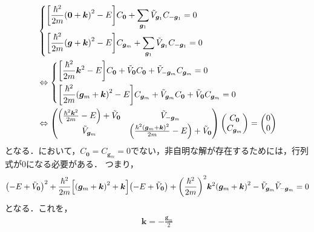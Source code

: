 \documentclass{report}
\begin{document}
      \begin{align}
        & \begin{dcases}
          \qty[\frac{\hbar^2}{2m}\qty(\bm{0} + \bm{k})^2 - E]C_{\bm{0}} + \sum_{\bm{g}_1}\tilde{V}_{\bm{g}_1}C_{-\bm{g}_1} = 0 \\
          \qty[\frac{\hbar^2}{2m}\qty(\bm{g} + \bm{k})^2 - E]C_{\bm{g}_m} + \sum_{\bm{g}_1}\tilde{V}_{\bm{g}_1}C_{-\bm{g}_1} = 0
        \end{dcases} \\ 
        & \Leftrightarrow
        \begin{dcases}
          \qty[\frac{\hbar^2}{2m}\bm{k}^2 - E]C_{\bm{0}} + \tilde{V}_{\bm{0}}C_{\bm{0}} + \tilde{V}_{-\bm{g}_m}C_{\bm{g}_m} = 0 \\
          \qty[\frac{\hbar^2}{2m}\qty(\bm{g}_m + \bm{k})^2 - E]C_{\bm{g}_m} + \tilde{V}_{\bm{g}_m}C_{\bm{0}} + \tilde{V}_{\bm{0}}C_{\bm{g}_m} = 0
        \end{dcases} \\ 
        & \Leftrightarrow
        \begin{pmatrix}
          \qty(\frac{\hbar^2\bm{k}^2}{2m} - E) + \tilde{V}_{\bm{0}} & \tilde{V}_{-\bm{g}_m} \\
          \tilde{V}_{\bm{g}_m} & \qty(\frac{\hbar^2\qty(\bm{g}_m + \bm{k})^2}{2m} - E) + \tilde{V}_{\bm{0}}
        \end{pmatrix}
        \begin{pmatrix}
          C_{\bm{0}} \\ 
          C_{\bm{g}_m}
        \end{pmatrix}
        = 
        \begin{pmatrix}
          0 \\ 
          0 
        \end{pmatrix} \label{schrodinger-matrix}
      \end{align}
      となる．において，$C_{\bm{0}} = C_{\bm{g}_m} = 0$でない，非自明な解が存在するためには，行列式が0になる必要がある．
      つまり，
      \begin{align}
        \qty(-E + \tilde{V}_{\bm{0}})^2 + \frac{\hbar^2}{2m}\qty[\qty(\bm{g}_m + \bm{k})^2 + \bm{k}]\qty(-E + \tilde{V}_{\bm{0}}) + \qty(\frac{\hbar^2}{2m})^2\bm{k}^2\qty(\bm{g}_m + \bm{k})^2 - \tilde{V}_{\bm{g}_m}\tilde{V}_{-\bm{g}_m} = 0
      \end{align}
      となる．これを，
      \begin{align}
        \bm{k} = -\frac{\bm{g}_m}{2}
      \end{align}
\end{document}
